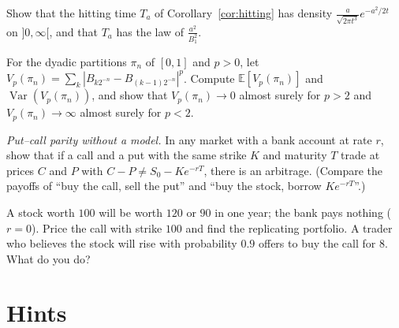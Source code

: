 \begin{exercise}[$\star$]\label{ex:hittingdensity}
Show that the hitting time $T_a$ of Corollary~\ref{cor:hitting} has density $\frac a{\sqrt{2\pi t^3}}e^{-a^2/2t}$ on $]0,\infty[$, and that $T_a$ has the law of $\frac{a^2}{B_1^2}$.
\end{exercise}

\begin{exercise}[$\star$]\label{ex:pvariation}
For the dyadic partitions $\pi_n$ of $[0,1]$ and $p>0$, let $V_p(\pi_n)=\sum_k|B_{k2^{-n}}-B_{(k-1)2^{-n}}|^p$. Compute $\mathbb E[V_p(\pi_n)]$ and $\operatorname{Var}(V_p(\pi_n))$, and show that
$V_p(\pi_n)\to0$ almost surely for $p>2$ and $V_p(\pi_n)\to\infty$ almost surely for $p<2$.
\end{exercise}

\begin{exercise}[$\star$]\label{ex:putcall}
\emph{Put--call parity without a model.} In any market with a bank account at rate $r$, show that if a call and a put with
the same strike $K$ and maturity $T$ trade at prices $C$ and $P$ with $C-P\ne S_0-Ke^{-rT}$, there is an arbitrage. (Compare the payoffs of
``buy the call, sell the put'' and ``buy the stock, borrow $Ke^{-rT}$''.)
\end{exercise}

\begin{exercise}[$\star$]\label{ex:onestep}
A stock worth $100$ will be worth $120$ or $90$ in one year; the bank pays nothing ($r=0$). Price the call with strike $100$ and find the
replicating portfolio. A trader who believes the stock will rise with probability $0.9$ offers to buy the call for $8$. What do you do?
\end{exercise}

\section{Hints}

